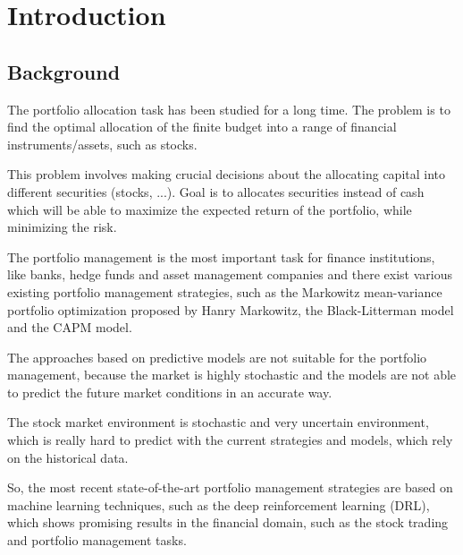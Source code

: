 

\chapter{Introduction}\label{ch:introduction}


\section{Background}\label{sec:background}
The portfolio allocation task has been studied for a long time.
The problem is to find the optimal allocation of the finite
budget into a range of financial
instruments/assets, such as stocks.\cite{Model-Free-Reinforcement-Learning-for-Asset-Allocation}

This problem involves making crucial decisions about the allocating capital into
different securities (stocks, ...).
Goal is to allocates securities instead of cash which will be able to
maximize the expected return of the
portfolio, while minimizing the risk.

The portfolio management is the most important task for
finance institutions, like banks, hedge funds and asset management companies
and there exist various existing portfolio management strategies, such as the
Markowitz mean-variance portfolio optimization proposed by Hanry Markowitz\cite[p.~4]{sirucek-2015},
the Black-Litterman model and the CAPM model.

The approaches based on predictive models are not suitable for the portfolio
management, because the market is highly stochastic and the models are not able to
predict the future market conditions in an accurate way.

The stock market environment is stochastic and very uncertain environment, which is
really hard to predict with the current strategies and models, which rely
on the historical data.

So, the most recent state-of-the-art portfolio management strategies are based on
machine learning techniques, such as the deep reinforcement learning (DRL), which
shows promising results in the financial domain, such as the stock trading and
portfolio management tasks.


